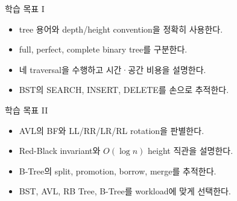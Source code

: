 \begin{frame}[plain]
\vspace*{-8mm}
\titlepage
\end{frame}
\begin{frame}{학습 목표 I}
\begin{itemize}
\item tree 용어와 depth/height convention을 정확히 사용한다.
\item full, perfect, complete binary tree를 구분한다.
\item 네 traversal을 수행하고 시간·공간 비용을 설명한다.
\item BST의 SEARCH, INSERT, DELETE를 손으로 추적한다.
\end{itemize}
\end{frame}
\begin{frame}{학습 목표 II}
\begin{itemize}
\item AVL의 BF와 LL/RR/LR/RL rotation을 판별한다.
\item Red-Black invariant와 $O(\log n)$ height 직관을 설명한다.
\item B-Tree의 split, promotion, borrow, merge를 추적한다.
\item BST, AVL, RB Tree, B-Tree를 workload에 맞게 선택한다.
\end{itemize}
\end{frame}
